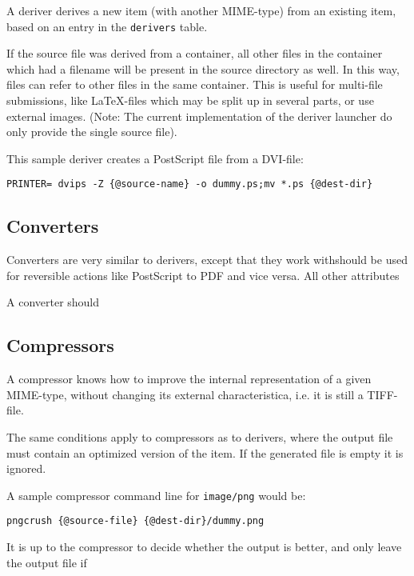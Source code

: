 A deriver derives a new item (with another MIME-type) from
an existing item, based on an entry in the \texttt{derivers}
table.  

If the source file was derived from a container, all other files in
the container which had a filename will be present in the source
directory as well.  In this way, files can refer to other files in the
same container.  This is useful for multi-file submissions, like
{\LaTeX}-files which may be split up in several parts, or use external
images.  (Note:  The current implementation of the deriver launcher do
only provide the single source file).

This sample deriver creates a PostScript file from a DVI-file:

\begin{verbatim}
PRINTER= dvips -Z {@source-name} -o dummy.ps;mv *.ps {@dest-dir}
\end{verbatim}






\subsection{Converters}

Converters are very similar to derivers, except that they
work withshould be used for reversible actions like
PostScript to PDF and vice versa.   All other attributes 

A converter should 

\subsection{Compressors}

A compressor knows how to improve the internal
representation of a given MIME-type, without changing its
external characteristica, i.e. it is still a TIFF-file.

The same conditions apply to compressors as to derivers,
where the output file must contain an optimized version of
the item.  If the generated file is empty it is ignored.

A sample compressor command line for \texttt{image/png} would be:

\begin{verbatim}
pngcrush {@source-file} {@dest-dir}/dummy.png
\end{verbatim}

It is up to the compressor to decide whether the output is better, and
only leave the output file if 



